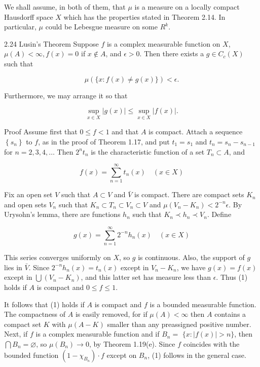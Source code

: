 \documentclass[10pt]{article}
\begin{document}
We shall assume, in both of them, that $\mu$ is a measure on a locally compact Hausdorff space $X$ which has the properties stated in Theorem 2.14. In particular, $\mu$ could be Lebesgue measure on some $R^{k}$.

2.24 Lusin's Theorem Suppose $f$ is a complex measurable function on $X$, $\mu(A)<\infty, f(x)=0$ if $x \notin A$, and $\epsilon>0$. Then there exists a $g \in C_{c}(X)$ such that

$$
\mu(\{x: f(x) \neq g(x)\})<\epsilon .
$$

Furthermore, we may arrange it so that

$$
\sup _{x \in X}|g(x)| \leq \sup _{x \in X}|f(x)| .
$$

Proof Assume first that $0 \leq f<1$ and that $A$ is compact. Attach a sequence $\left\{s_{n}\right\}$ to $f$, as in the proof of Theorem 1.17, and put $t_{1}=s_{1}$ and $t_{n}=s_{n}-s_{n-1}$ for $n=2,3,4, \ldots$ Then $2^{n} t_{n}$ is the characteristic function of a set $T_{n} \subset A$, and

$$
f(x)=\sum_{n=1}^{\infty} t_{n}(x) \quad(x \in X)
$$

Fix an open set $V$ such that $A \subset V$ and $\bar{V}$ is compact. There are compact sets $K_{n}$ and open sets $V_{n}$ such that $K_{n} \subset T_{n} \subset V_{n} \subset V$ and $\mu\left(V_{n}-K_{n}\right)<2^{-n} \epsilon$. By Urysohn's lemma, there are functions $h_{n}$ such that $K_{n} \prec h_{n} \prec V_{n}$. Define

$$
g(x)=\sum_{n=1}^{\infty} 2^{-n} h_{n}(x) \quad(x \in X)
$$

This series converges uniformly on $X$, so $g$ is continuous. Also, the support of $g$ lies in $\bar{V}$. Since $2^{-n} h_{n}(x)=t_{n}(x)$ except in $V_{n}-K_{n}$, we have $g(x)=f(x)$
except in $\bigcup\left(V_{n}-K_{n}\right)$, and this latter set has measure less than $\epsilon$. Thus (1) holds if $A$ is compact and $0 \leq f \leq 1$.

It follows that (1) holds if $A$ is compact and $f$ is a bounded measurable function. The compactness of $A$ is easily removed, for if $\mu(A)<\infty$ then $A$ contains a compact set $K$ with $\mu(A-K)$ smaller than any preassigned positive number. Next, if $f$ is a complex measurable function and if $B_{n}=$ $\{x:|f(x)|>n\}$, then $\bigcap B_{n}=\varnothing$, so $\mu\left(B_{n}\right) \rightarrow 0$, by Theorem 1.19(e). Since $f$ coincides with the bounded function $\left(1-\chi_{B_{n}}\right) \cdot f$ except on $B_{n}$, (1) follows in the general case.
\end{document}
